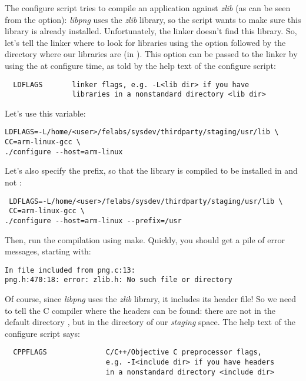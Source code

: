 The configure script tries to compile an application against {\em
  zlib} (as can be seen from the  option): {\em libpng} uses
the {\em zlib} library, so the  script wants to make
sure this library is already installed. Unfortunately, the 
linker doesn't find this library. So, let's tell the linker where to
look for libraries using the  option followed by the
directory where our libraries are (in ). This
 option can be passed to the linker by using the
 at configure time, as told by the help text of the
configure script:

\begin{verbatim}
  LDFLAGS       linker flags, e.g. -L<lib dir> if you have
                libraries in a nonstandard directory <lib dir>
\end{verbatim}

Let's use this  variable:

\begin{verbatim}
LDFLAGS=-L/home/<user>/felabs/sysdev/thirdparty/staging/usr/lib \
CC=arm-linux-gcc \
./configure --host=arm-linux
\end{verbatim}

Let's also specify the prefix, so that the library is compiled to be
installed in  and not :

\begin{verbatim}
 LDFLAGS=-L/home/<user>/felabs/sysdev/thirdparty/staging/usr/lib \
 CC=arm-linux-gcc \
./configure --host=arm-linux --prefix=/usr
\end{verbatim}

Then, run the compilation using make. Quickly, you should get a pile
of error messages, starting with:

\begin{verbatim}
In file included from png.c:13:
png.h:470:18: error: zlib.h: No such file or directory
\end{verbatim}

Of course, since {\em libpng} uses the {\em zlib} library, it includes
its header file! So we need to tell the C compiler where the headers
can be found: there are not in the default directory
, but in the  directory of our
{\em staging} space. The help text of the configure script says:

\begin{verbatim}
  CPPFLAGS              C/C++/Objective C preprocessor flags,
                        e.g. -I<include dir> if you have headers
                        in a nonstandard directory <include dir>
\end{verbatim}

